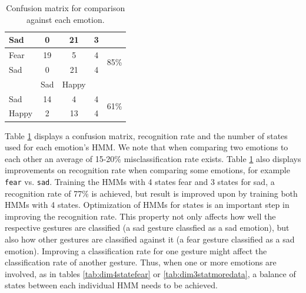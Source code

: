 \documentclass[]{report}   %
\begin{document}
\begin{table}[htbp]
\begin{tabular}{|l|c|c||c|r|}
        Sad  & 0    & 21   & 3   &  \\ \hline
		Fear & 19     & 5    & 4   & \multirow{2}{*}{85\%} \\ 
        Sad  & 0    & 21   & 4   &  \\ \hline		\hline
             & Sad & Happy & \multicolumn{2}{|c|}{}\\ \hline
        Sad & 14     & 4    & 4   & \multirow{2}{*}{61\%} \\ 
        Happy  & 2    & 13   & 4  &  \\ \hline
		\end{tabular}
	\caption{Confusion matrix for comparison against each emotion.}
	\label{tab:dimemocomp}
\end{table}

Table \ref{tab:dimemocomp} displays a confusion matrix, recognition rate and the number of states used for each emotion's HMM. We note that when comparing two emotions to each other an average of 15-20\% misclassification rate exists. Table \ref{tab:dimemocomp} also displays improvements on recognition rate when comparing some emotions, for example \texttt{fear} vs. \texttt{sad}. Training the HMMs with 4 states fear and 3 states for sad, a recognition rate of 77\% is achieved, but result is improved upon by training both HMMs with 4 states. Optimization of HMMs for states is an important step in improving the recognition rate. This property not only affects how well the respective gestures are classified (a sad gesture classfied as a sad emotion), but also how other gestures are classified against it (a fear gesture classified as a sad emotion). Improving a classification rate for one gesture might affect the classification rate of another gesture. Thus, when one or more emotions are involved, as in tables \ref{tab:dim4statefear} or \ref{tab:dim3statmoredata}, a balance of states between each individual HMM needs to be achieved.
\end{document}
